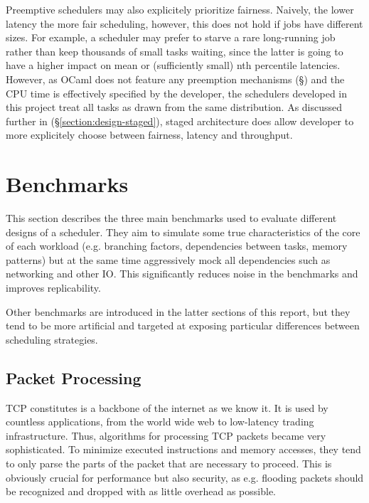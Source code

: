 \documentclass[12pt,a4paper,twoside]{report}
\begin{document}
Preemptive schedulers may also explicitely prioritize fairness. Naively, the lower latency the more fair scheduling, however, this does not hold if jobs have different sizes. For example, a scheduler may prefer to starve a rare long-running job rather than keep thousands of small tasks waiting, since the latter is going to have a higher impact on mean or (sufficiently small) nth percentile latencies. However, as OCaml does not feature any preemption mechanisms (\S\cite{paragraph:ocaml_preemption}) and the CPU time is effectively specified by the developer, the schedulers developed in this project treat all tasks as drawn from the same distribution. As discussed further in (\S\ref{section:design-staged}), staged architecture does allow developer to more explicitely choose between fairness, latency and throughput. 


\section{Benchmarks}


This section describes the three main benchmarks used to evaluate different designs of a scheduler. They aim to simulate some true characteristics of the core of each workload (e.g. branching factors, dependencies between tasks, memory patterns) but at the same time aggressively mock all dependencies such as networking and other IO. This significantly reduces noise in the benchmarks and improves replicability. 


Other benchmarks are introduced in the latter sections of this report, but they tend to be more artificial and targeted at exposing particular differences between scheduling strategies. 

\subsection{Packet Processing}
\label{section:background_packet-processing}
TCP constitutes is a backbone of the internet as we know it. It is used by countless applications, from the world wide web to low-latency trading infrastructure. Thus, algorithms for processing TCP packets became very sophisticated. To minimize executed instructions and memory accesses, they tend to only parse the parts of the packet that are necessary to proceed. This is obviously crucial for performance but also security, as e.g. flooding packets should be recognized and dropped with as little overhead as possible. 
\end{document}

